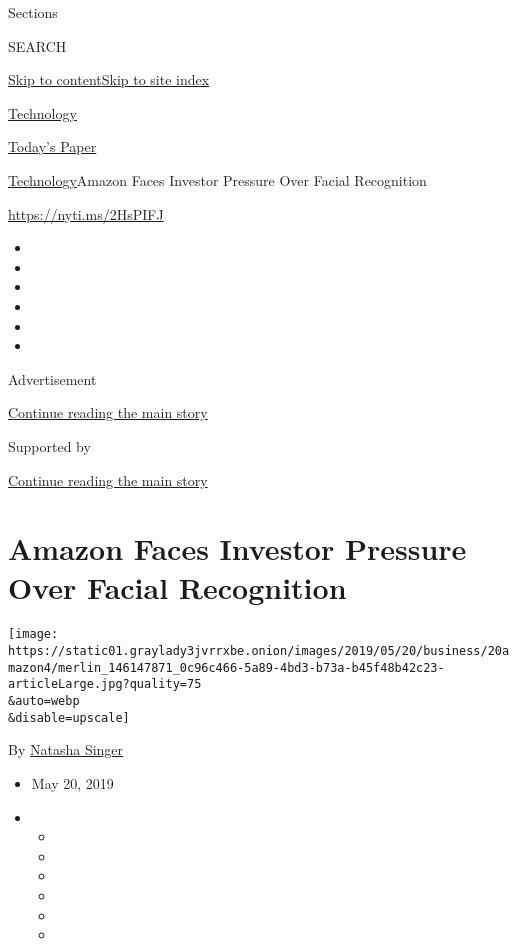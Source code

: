 Sections

SEARCH

\protect\hyperlink{site-content}{Skip to
content}\protect\hyperlink{site-index}{Skip to site index}

\href{https://www.nytimes3xbfgragh.onion/section/technology}{Technology}

\href{https://myaccount.nytimes3xbfgragh.onion/auth/login?response_type=cookie\&client_id=vi}{}

\href{https://www.nytimes3xbfgragh.onion/section/todayspaper}{Today's
Paper}

\href{/section/technology}{Technology}\textbar{}Amazon Faces Investor
Pressure Over Facial Recognition

\url{https://nyti.ms/2HsPIFJ}

\begin{itemize}
\item
\item
\item
\item
\item
\item
\end{itemize}

Advertisement

\protect\hyperlink{after-top}{Continue reading the main story}

Supported by

\protect\hyperlink{after-sponsor}{Continue reading the main story}

\hypertarget{amazon-faces-investor-pressure-over-facial-recognition}{%
\section{Amazon Faces Investor Pressure Over Facial
Recognition}\label{amazon-faces-investor-pressure-over-facial-recognition}}

\texttt{[image: https://static01.graylady3jvrrxbe.onion/images/2019/05/20/business/20amazon4/merlin\_146147871\_0c96c466-5a89-4bd3-b73a-b45f48b42c23-articleLarge.jpg?quality=75\\\&auto=webp\\\&disable=upscale]}

By \href{https://www.nytimes3xbfgragh.onion/by/natasha-singer}{Natasha
Singer}

\begin{itemize}
\item
  May 20, 2019
\item
  \begin{itemize}
  \item
  \item
  \item
  \item
  \item
  \item
  \end{itemize}
\end{itemize}

